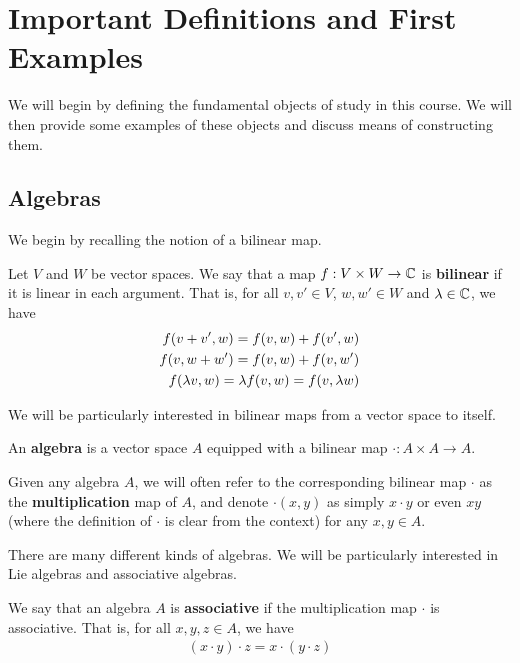\section{Important Definitions and First Examples}

We will begin by defining the fundamental objects of study in this course. We will then provide some examples of these objects and discuss means of constructing them.

\subsection{Algebras}

We begin by recalling the notion of a bilinear map.

\begin{definition}
    Let $V$ and $W$ be vector spaces. We say that a map $f: V \times W \to \mathbb{C}$ is \textbf{bilinear} if it is linear in each argument. That is, for all $v, v' \in V$, $w, w' \in W$ and $\lambda \in \mathbb{C}$, we have
    \begin{align*}
        \fof{v + v', w} = \fof{v, w} + \fof{v', w} \\
        \fof{v, w + w'} = \fof{v, w} + \fof{v, w'} \\
        \fof{\lambda v, w} = \lambda \fof{v, w} = \fof{v, \lambda w}
    \end{align*}
\end{definition}

We will be particularly interested in bilinear maps from a vector space to itself.

\begin{boxdefinition}[Algebra]
    An \textbf{algebra} is a vector space $A$ equipped with a bilinear map $\cdot: A \times A \to A$.
\end{boxdefinition}

\begin{boxconvention}
    Given any algebra $A$, we will often refer to the corresponding bilinear map $\cdot$ as the \textbf{multiplication} map of $A$, and denote $\cdot(x, y)$ as simply $x \cdot y$ or even $xy$ (where the definition of $\cdot$ is clear from the context) for any $x, y \in A$.
\end{boxconvention}

There are many different kinds of algebras. We will be particularly interested in Lie algebras and associative algebras.

\begin{boxdefinition}
    We say that an algebra $A$ is \textbf{associative} if the multiplication map $\cdot$ is associative. That is, for all $x, y, z \in A$, we have
    \begin{align*}
        (x \cdot y) \cdot z = x \cdot (y \cdot z)
    \end{align*}
\end{boxdefinition}

